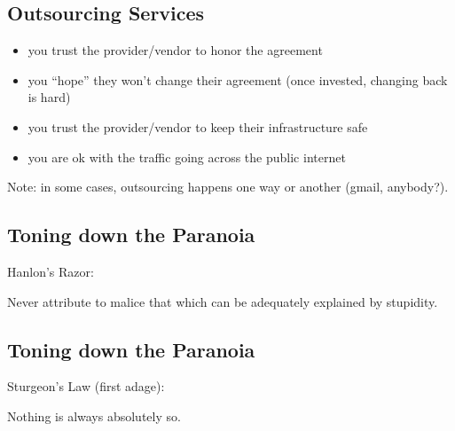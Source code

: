 \documentclass[xga]{xdvislides}
\begin{document}
\subsection{Outsourcing Services}
\begin{itemize}
	\item you trust the provider/vendor to honor the agreement
	\item you ``hope'' they won't change their agreement (once
		invested, changing back is hard)
	\item you trust the provider/vendor to keep their infrastructure
		safe
	\item you are ok with the traffic going across the public internet
\end{itemize}
\vspace{.5in}

Note: in some cases, outsourcing happens one way or another (gmail,
anybody?).


\subsection{Toning down the Paranoia}
Hanlon's Razor:
\\

\Huge
\begin{center}
Never attribute to malice that which can be adequately explained by stupidity.
\end{center}
\Normalsize

\subsection{Toning down the Paranoia}
Sturgeon's Law (first adage):
\\

\Huge
\begin{center}
Nothing is always absolutely so.
\end{center}
\Normalsize
\end{document}
